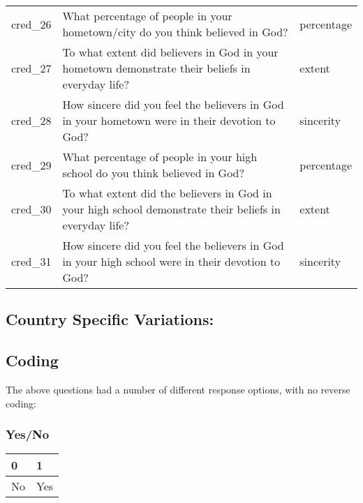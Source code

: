 \documentclass[
  letterpaper,
]{scrbook}
\begin{document}
\begin{longtable}[]{@{}
  >{\raggedright\arraybackslash}p{}
  >{\raggedright\arraybackslash}p{}
  >{\raggedright\arraybackslash}p{}@{}}
\toprule\noalign{}
\endhead
\bottomrule\noalign{}
\endlastfoot
cred\_26 & What percentage of people in your hometown/city do you think
believed in God? & percentage \\
cred\_27 & To what extent did believers in God in your hometown
demonstrate their beliefs in everyday life? & extent \\
cred\_28 & How sincere did you feel the believers in God in your
hometown were in their devotion to God? & sincerity \\
cred\_29 & What percentage of people in your high school do you think
believed in God? & percentage \\
cred\_30 & To what extent did the believers in God in your high school
demonstrate their beliefs in everyday life? & extent \\
cred\_31 & How sincere did you feel the believers in God in your high
school were in their devotion to God? & sincerity \\
\end{longtable}

\subsection{Country Specific
Variations:}\label{country-specific-variations}

\subsection*{Coding}\label{coding-1}

The above questions had a number of different response options, with no
reverse coding:

\subsubsection{Yes/No}\label{yesno}

\begin{longtable}[]{@{}ll@{}}
\toprule\noalign{}
0 & 1 \\
\midrule\noalign{}
\endhead
\bottomrule\noalign{}
\endlastfoot
No & Yes \\
\end{longtable}
\end{document}
